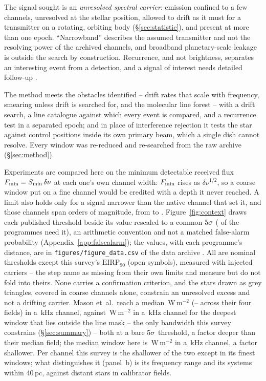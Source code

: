 The signal sought is an \emph{unresolved spectral carrier}: emission confined
to a few channels, unresolved at the stellar position, allowed to drift as it
must for a transmitter on a rotating, orbiting body (\S\ref{sec:statistic}),
and present at more than one epoch. ``Narrowband'' describes the assumed
transmitter and not the resolving power of the archived channels, and
broadband planetary-scale leakage \citep{BRaTs2026} is outside the search by
construction. Recurrence, and not brightness, separates an interesting event
from a detection, and a signal of interest needs detailed follow-up
\citep{Sheikh2021}.

The method meets the obstacles \citet{Mason2025} identified -- drift
rates that scale with frequency, smearing unless drift is searched for, and
the molecular line forest -- with a drift search, a line
catalogue against which every event is compared, and a recurrence test in a
separated epoch; and in place of interference rejection it tests the star
against control positions inside its own primary beam, which a single dish
cannot resolve. Every window was re-reduced and re-searched from the raw
archive (\S\ref{sec:method}).

Experiments are compared here on the minimum detectable received flux
$F_{\rm min}=S_{\rm min}\,\delta\nu$ at each one's own channel width: $F_{\rm
min}$ rises as $\delta\nu^{1/2}$, so a coarse window put on a fine channel
would be credited with a depth it never reached. A limit also holds only for
a signal narrower than the native channel that set it, and those channels
span \LtChanSpanDex{} orders of magnitude, from \LtChanNarrow{} to
\LtChanWide. Figure~\ref{fig:context} draws each published threshold beside
its value rescaled to a common $5\sigma$ (\LtNRescaled{} of the
\LtNProg{} programmes need it), an arithmetic convention and not a matched
false-alarm probability (Appendix~\ref{app:falsealarm}); the values, with
each programme's distance, are in \texttt{figures/figure\_data.csv} of the
data archive \citep{SIdeposit}. All are nominal thresholds except this
survey's $\mathrm{EIRP}_{90}$ (open symbols), measured with injected carriers
-- the step \citet{Price2020} name as missing from their own limits and
\citet{Margot2023} measure but do not fold into theirs. None carries a
confirmation criterion, and the \NgNDecBOnly{} stars drawn as grey triangles,
covered in coarse channels alone, constrain an unresolved excess and not a
drifting carrier. Mason et~al.\ reach a median \MasonFluxMed\,W\,m$^{-2}$
(\MasonFluxLo--\MasonFluxHi{} across their four fields) in a
\MasonChanKHz\,kHz channel, against \FluxTrigBest\,W\,m$^{-2}$ in a
\FluxChanBestKHz\,kHz channel for the deepest window that lies outside the
line mask -- the only bandwidth this survey constrains
(\S\ref{sec:summary}) -- both at a bare $5\sigma$ threshold, a
factor \FluxNatBestRatio{} deeper than their median field; the median window
here is \FluxTrigMed\,W\,m$^{-2}$ in a \FluxChanMedKHz\,kHz channel, a factor
\FluxNatMedRatio{} shallower. Per channel this survey is the shallower of the
two except in its finest windows; what distinguishes it (panel~b) is its
frequency range and its \NSysClassA{} systems within 40\,pc, against distant
stars in \MasonNCal{} calibrator fields.

